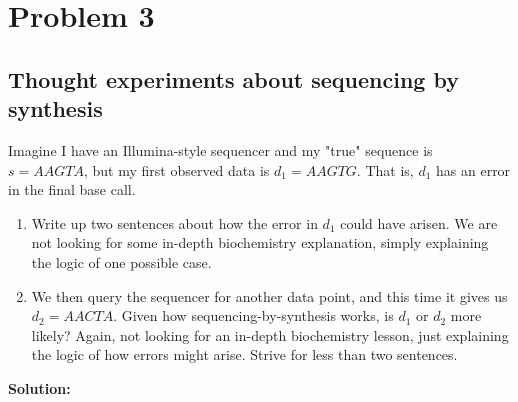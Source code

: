 \documentclass[10pt]{article}
\newcommand{\solution}{\textbf{Solution:}}
\begin{document}
\section*{Problem 3}
\subsection*{Thought experiments about sequencing by synthesis}
Imagine I have an Illumina-style sequencer and my "true" sequence is $s = AAGTA$, but my first observed data is $d_1 = AAGTG$.  That is, $d_1$ has an error in the final base call.
\begin{enumerate}[~~(a)]
    \item Write up two sentences about how the error in $d_1$ could have arisen.  We are not looking for some in-depth biochemistry explanation, simply explaining the logic of one possible case.
    \item We then query the sequencer for another data point, and this time it gives us $d_2 = AACTA$.  Given how sequencing-by-synthesis works, is $d_1$ or $d_2$ more likely?  Again, not looking for an in-depth biochemistry lesson, just explaining the logic of how errors might arise.  Strive for less than two sentences.
\end{enumerate}
\solution\\
\end{document}
